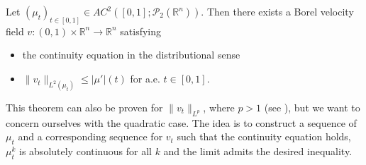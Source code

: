 \begin{theorem}
	Let $(\mu_t)_{t\in[0,1]}\in AC^2([0,1];\mathscr{P}_2(\mathbb R^n))$. Then there exists a Borel velocity field $v:(0,1)\times \mathbb{R}^n\to \mathbb{R}^n$ satisfying 
	\begin{itemize}
		\item the continuity equation in the distributional sense
		\item $\lVert v_t\rVert_{L^2(\mu_t)}\leq|\mu'|(t)$ for a.e. $t\in[0,1]$.
	\end{itemize}
\end{theorem}
This theorem can also be proven for $\lVert v_t\rVert_{L^p}$, where $p>1$ (see \cite{AmbrosioSavare2007}), but we want to concern ourselves with the quadratic case. The idea is to construct a sequence of $\mu_t$ and a corresponding sequence for $v_t$ such that the continuity equation holds, $\mu_t^k$ is absolutely continuous for all $k$ and the limit admits the desired inequality.
